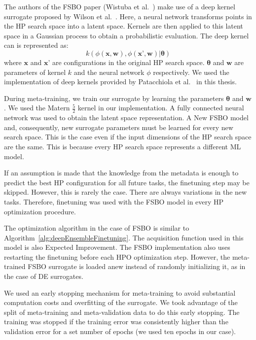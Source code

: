 \documentclass[12pt, twoside, ngerman]{report}
\begin{document}
The authors of the FSBO paper (Wistuba et al.~\cite{fsbopaper}) make use of a deep kernel surrogate proposed by Wilson et al.~\cite{pmlr-v51-wilson16}.
Here, a neural network transforms points in the HP search space into a latent space.
Kernels are then applied to this latent space in a Gaussian process to obtain a probabilistic evaluation.
The deep kernel can is represented as:~\cite{fsbopaper}
$$
k(\phi(\textbf{x}, \textbf{w})  ,   \phi(\textbf{x'}, \textbf{w}) |  \mathbf{\theta})
$$
where $\textbf{x}$ and $\textbf{x'}$ are configurations in the original HP search space. $\mathbf{\theta}$ and $\textbf{w}$ are parameters of kernel $k$ and the neural network $\phi$ respectively.
We used the implementation of deep kernels provided by Patacchiola et al.~\cite{patacchiola2020bayesian} in this thesis.

During meta-training, we train our surrogate by learning the parameters $\mathbf{\theta}$ and $\textbf{w}$.
We used the Matern $\frac{5}{2}$ kernel in our implementation.
A fully connected neural network was used to obtain the latent space representation.
A New FSBO model and, consequently, new surrogate parameters must be learned for every new search space.
This is the case even if the input dimensions of the HP search space are the same.
This is because every HP search space represents a different ML model.

If an assumption is made that the knowledge from the metadata is enough to predict the best HP configuration for all future tasks, the finetuning step may be skipped.
However,  this is rarely the case. There are always variations in the new tasks.
Therefore, finetuning was used with the FSBO model in every HP optimization procedure.

The optimization algorithm in the case of FSBO is similar to Algorithm~\ref{alg:deepEnsembleFinetuning}.
The acquisition function used in this model is also Expected Improvement.
The FSBO implementation also uses restarting the finetuning before each HPO optimization step.
However, the meta-trained FSBO surrogate is loaded anew instead of randomly initializing it, as in the case of DE surrogates.

We used an early stopping mechanism for meta-training to avoid substantial computation costs and overfitting of the surrogate.
We took advantage of the split of meta-training and meta-validation data to do this early stopping.
The training was stopped if the training error was consistently higher than the validation error for a set number of epochs (we used ten epochs in our case).
 
\end{document}
